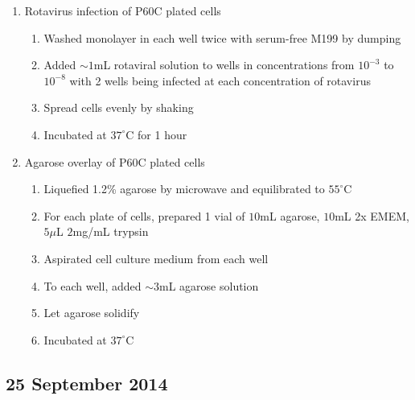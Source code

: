 \begin{enumerate}
	\item Rotavirus infection of P60C plated cells
		\begin{enumerate}
			\item Washed monolayer in each well twice with serum-free M199 by dumping
			\item Added $\sim1$mL rotaviral solution to wells in concentrations from $10^{-3}$ to $10^{-8}$ with 2 wells being infected at each concentration of rotavirus
			\item Spread cells evenly by shaking
			\item Incubated at $37^{\circ}$C for 1 hour
		\end{enumerate}
	\item Agarose overlay of P60C plated cells
		\begin{enumerate}
			\item Liquefied 1.2\% agarose by microwave and equilibrated to $55^{\circ}$C
			\item For each plate of cells, prepared 1 vial of $10$mL agarose, $10$mL 2x EMEM, $5\mu$L $2$mg/mL trypsin
			\item Aspirated cell culture medium from each well
			\item To each well, added $\sim3$mL agarose solution
			\item Let agarose solidify
			\item Incubated at $37^{\circ}$C
		\end{enumerate}
\end{enumerate}

\subsection*{25 September 2014}

